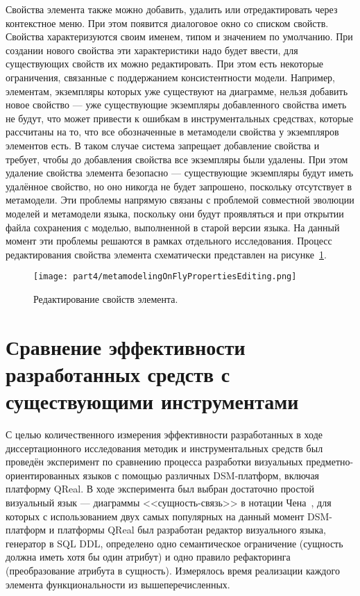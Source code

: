 Свойства элемента также можно добавить, удалить или отредактировать через контекстное 
меню. При этом появится диалоговое окно со списком свойств. Свойства характеризуются 
своим именем, типом и значением по умолчанию. При создании нового свойства эти характеристики 
надо будет ввести, для существующих свойств их можно редактировать. При этом есть 
некоторые ограничения, связанные с поддержанием консистентности модели. Например, 
элементам, экземпляры которых уже существуют на диаграмме, нельзя добавить новое свойство 
--- уже существующие экземпляры добавленного свойства иметь не будут, что может привести 
к ошибкам в инструментальных средствах, которые рассчитаны на то, что все обозначенные 
в метамодели свойства у экземпляров элементов есть. В таком случае система запрещает 
добавление свойства и требует, чтобы до добавления свойства все экземпляры были удалены. 
При этом удаление свойства элемента безопасно --- существующие экземпляры будут иметь 
удалённое свойство, но оно никогда не будет запрошено, поскольку отсутствует в метамодели. 
Эти проблемы напрямую связаны с проблемой совместной эволюции моделей и метамодели языка, 
поскольку они будут проявляться и при открытии файла сохранения с моделью, выполненной в 
старой версии языка. На данный момент эти проблемы решаются в рамках отдельного исследования. 
Процесс редактирования свойства элемента схематически представлен на рисунке~\ref{image:metamodelingOnFlyPropertiesEditing}.

\begin{figure} [ht]
	\begin{center}
		\texttt{[image: part4/metamodelingOnFlyPropertiesEditing.png]}
		\caption{Редактирование свойств элемента.}
		\label{image:metamodelingOnFlyPropertiesEditing}
	\end{center}
\end{figure}

\section{Сравнение эффективности разработанных средств с существующими инструментами}
С целью количественного измерения эффективности разработанных в ходе диссертационного
исследования методик и инструментальных средств был проведён эксперимент по сравнению
процесса разработки визуальных предметно-ориентированных языков с помощью различных 
\ac{DSM}-платформ, включая платформу QReal. В ходе эксперимента был выбран достаточно простой визуальный
язык --- диаграммы <<сущность-связь>> в нотации Чена~\cite{chen1976er}, для которых
с использованием двух самых популярных на данный момент \ac{DSM}-платформ и платформы QReal 
был разработан редактор визуального языка, генератор в \ac{SQL} \ac{DDL}, определено 
одно семантическое ограничение (сущность должна иметь хотя бы один атрибут) и одно правило
рефакторинга (преобразование атрибута в сущность). Измерялось время реализации каждого элемента
функциональности из вышеперечисленных.

